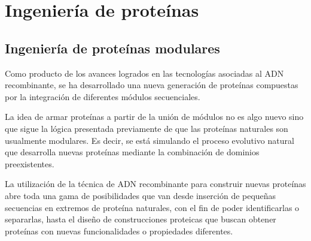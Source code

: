 %             
       
\section{Ingeniería de proteínas}\label{proteinEngineering}
\subsection{Ingeniería de proteínas modulares}    

Como producto de los avances logrados en las tecnologías asociadas al ADN recombinante, se ha desarrollado una nueva generación de proteínas compuestas por la integración
de diferentes módulos secuenciales.

La idea de armar proteínas a partir de la unión de módulos no es algo nuevo sino que sigue la lógica presentada previamente de que las proteínas naturales son usualmente modulares. 
Es decir, se está simulando el proceso evolutivo natural que desarrolla nuevas proteínas mediante la combinación de dominios preexistentes.

La utilización de la técnica de ADN recombinante para construir nuevas proteínas abre toda una gama de posibilidades que van desde inserción de pequeñas secuencias en extremos de proteína naturales, 
con el fin de poder identificarlas o separarlas, hasta el diseño de construcciones proteicas que buscan obtener proteínas con nuevas funcionalidades o propiedades diferentes.

